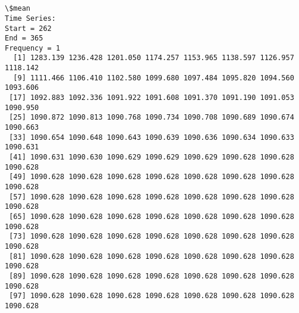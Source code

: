 \documentclass[11pt]{article}
\begin{document}
    \begin{center}
    \end{center}
    { \hspace*{\fill} \\}
    
    \begin{center}
    \end{center}
    { \hspace*{\fill} \\}
    
    \begin{Verbatim}[commandchars=\\\{\}]
\$mean
Time Series:
Start = 262 
End = 365 
Frequency = 1 
  [1] 1283.139 1236.428 1201.050 1174.257 1153.965 1138.597 1126.957 1118.142
  [9] 1111.466 1106.410 1102.580 1099.680 1097.484 1095.820 1094.560 1093.606
 [17] 1092.883 1092.336 1091.922 1091.608 1091.370 1091.190 1091.053 1090.950
 [25] 1090.872 1090.813 1090.768 1090.734 1090.708 1090.689 1090.674 1090.663
 [33] 1090.654 1090.648 1090.643 1090.639 1090.636 1090.634 1090.633 1090.631
 [41] 1090.631 1090.630 1090.629 1090.629 1090.629 1090.628 1090.628 1090.628
 [49] 1090.628 1090.628 1090.628 1090.628 1090.628 1090.628 1090.628 1090.628
 [57] 1090.628 1090.628 1090.628 1090.628 1090.628 1090.628 1090.628 1090.628
 [65] 1090.628 1090.628 1090.628 1090.628 1090.628 1090.628 1090.628 1090.628
 [73] 1090.628 1090.628 1090.628 1090.628 1090.628 1090.628 1090.628 1090.628
 [81] 1090.628 1090.628 1090.628 1090.628 1090.628 1090.628 1090.628 1090.628
 [89] 1090.628 1090.628 1090.628 1090.628 1090.628 1090.628 1090.628 1090.628
 [97] 1090.628 1090.628 1090.628 1090.628 1090.628 1090.628 1090.628 1090.628


\end{Verbatim}
\end{document}
